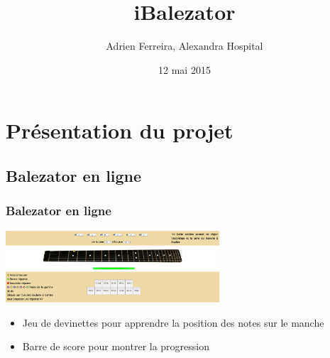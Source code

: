\documentclass{beamer}
\title{iBalezator}
\author{Adrien Ferreira, Alexandra Hospital}
\institute{Client : Thomas Baspeyras\\
Encadrant : Fabrice Kordon
}
\date{12 mai 2015}
\begin{document}
   \begin{frame}

      \titlepage

   \end{frame}






\section{Présentation du projet}

	\subsection{Balezator en ligne}

	\begin{frame}

		\frametitle{Balezator en ligne}
			\begin{center}
				\includegraphics[width=8cm]{images/balezator_manche.png}
			\end{center}
			\begin{itemize}
				\item Jeu de devinettes pour apprendre la position des notes sur le manche
				\item Barre de score pour montrer la progression
			\end{itemize}
	\end{frame} 

\end{document}
